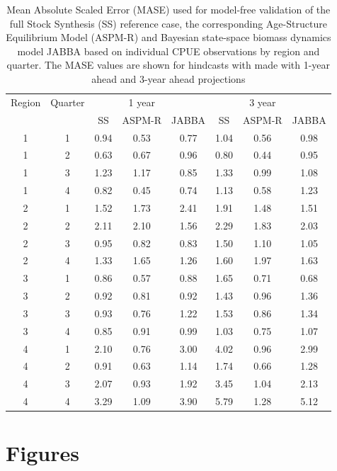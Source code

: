 \documentclass[11pt,a4paper]{article}
\begin{document}
{\begin{table}[ht]
\caption{Mean Absolute Scaled Error (MASE) used for model-free validation of  the full Stock Synthesis (SS) reference case, the corresponding Age-Structure Equilibrium Model (ASPM-R) and Bayesian state-space biomass dynamics model JABBA based on individual CPUE observations by region and quarter. The MASE values are shown for hindcasts with made with 1-year ahead and 3-year ahead projections  }
\begin{center}
\label{tab:mase}
\small
\begin{tabular}{|cc|ccc|ccc|}
\hline
Region & Quarter &    & 1 year & & & 3 year &   \\
     &         & SS & ASPM-R & JABBA & SS & ASPM-R & JABBA  \\
\hline\hline
  1 & 1 & 0.94 & 0.53 & 0.77 & 1.04 & 0.56 & 0.98 \\ 
  1 & 2 & 0.63 & 0.67 & 0.96 & 0.80 & 0.44 & 0.95 \\ 
  1 & 3 & 1.23 & 1.17 & 0.85 & 1.33 & 0.99 & 1.08 \\ 
   1 & 4 & 0.82 & 0.45 & 0.74 & 1.13 & 0.58 & 1.23 \\ 
  2 & 1 & 1.52 & 1.73 & 2.41 & 1.91 & 1.48 & 1.51 \\ 
  2 & 2 & 2.11 & 2.10 & 1.56 & 2.29 & 1.83 & 2.03 \\ 
  2 & 3 & 0.95 & 0.82 & 0.83 & 1.50 & 1.10 & 1.05 \\ 
  2 & 4 & 1.33 & 1.65 & 1.26 & 1.60 & 1.97 & 1.63 \\ 
  3 & 1 & 0.86 & 0.57 & 0.88 & 1.65 & 0.71 & 0.68 \\ 
  3 & 2 & 0.92 & 0.81 & 0.92 & 1.43 & 0.96 & 1.36 \\ 
  3 & 3 & 0.93 & 0.76 & 1.22 & 1.53 & 0.86 & 1.34 \\ 
  3 & 4 & 0.85 & 0.91 & 0.99 & 1.03 & 0.75 & 1.07 \\ 
  4 & 1 & 2.10 & 0.76 & 3.00 & 4.02 & 0.96 & 2.99 \\ 
  4 & 2 & 0.91 & 0.63 & 1.14 & 1.74 & 0.66 & 1.28 \\ 
  4 & 3 & 2.07 & 0.93 & 1.92 & 3.45 & 1.04 & 2.13 \\ 
  4 & 4 & 3.29 & 1.09 & 3.90 & 5.79 & 1.28 & 5.12 \\ 
\hline
\end{tabular}
\end{center}
\end{table}


\clearpage
\newpage
\section{Figures}


}
\end{document}
